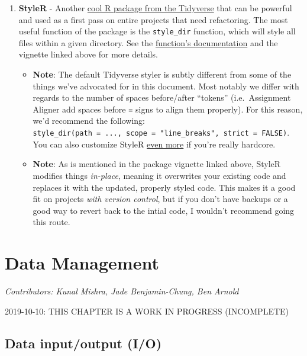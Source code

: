\documentclass[]{book}
\providecommand{\tightlist}{%
  \setlength{\itemsep}{0pt}\setlength{\parskip}{0pt}}
\begin{document}
\begin{enumerate}
\def\labelenumi{\arabic{enumi}.}
\setcounter{enumi}{2}
\tightlist
\item
  \textbf{StyleR} - Another \href{https://www.tidyverse.org/articles/2017/12/styler-1.0.0/}{cool R package from the Tidyverse} that can be powerful and used as a first pass on entire projects that need refactoring. The most useful function of the package is the \texttt{style\_dir} function, which will style all files within a given directory. See the \href{https://www.rdocumentation.org/packages/styler/versions/1.1.0/topics/style_dir}{function's documentation} and the vignette linked above for more details.

  \begin{itemize}
  \tightlist
  \item
    \textbf{Note}: The default Tidyverse styler is subtly different from some of the things we've advocated for in this document. Most notably we differ with regards to the number of spaces before/after ``tokens'' (i.e.~Assignment Aligner add spaces before \texttt{=} signs to align them properly). For this reason, we'd recommend the following: \texttt{style\_dir(path\ =\ ...,\ scope\ =\ "line\_breaks",\ strict\ =\ FALSE)}. You can also customize StyleR \href{http://styler.r-lib.org/articles/customizing_styler.html}{even more} if you're really hardcore.
  \item
    \textbf{Note}: As is mentioned in the package vignette linked above, StyleR modifies things \emph{in-place}, meaning it overwrites your existing code and replaces it with the updated, properly styled code. This makes it a good fit on projects \emph{with version control}, but if you don't have backups or a good way to revert back to the intial code, I wouldn't recommend going this route.
  \end{itemize}
\end{enumerate}

\hypertarget{datamanagement}{%
\chapter{Data Management}\label{datamanagement}}

\emph{Contributors: Kunal Mishra, Jade Benjamin-Chung, Ben Arnold}

2019-10-10: THIS CHAPTER IS A WORK IN PROGRESS (INCOMPLETE)

\hypertarget{data-inputoutput-io}{%
\section{Data input/output (I/O)}\label{data-inputoutput-io}}
\end{document}
